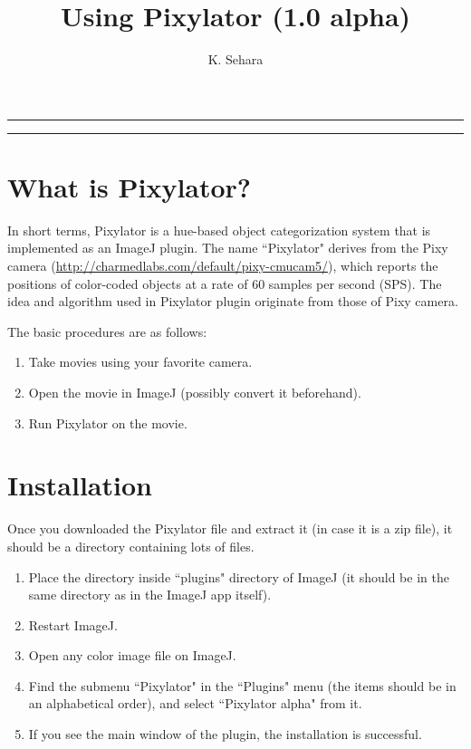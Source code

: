 \documentclass[a4paper,oneside,10pt]{article}
\title{Using Pixylator (1.0 alpha)}
\author{K. Sehara}
\date{\vspace{-5ex}}
\begin{document}
\maketitle

\hrule

\tableofcontents

\vspace{3ex}

\hrule

\newpage

\section{What is Pixylator?}
In short terms, Pixylator is a hue-based object categorization system that is implemented as an ImageJ plugin. The name ``Pixylator" derives from the Pixy camera (\url{http://charmedlabs.com/default/pixy-cmucam5/}), which reports the positions of color-coded objects at a rate of 60 samples per second (SPS). 
The idea and algorithm used in Pixylator plugin originate from those of Pixy camera.


The basic procedures are as follows:
\begin{enumerate}
\item Take movies using your favorite camera.
\item Open the movie in ImageJ (possibly convert it beforehand).
\item Run Pixylator on the movie.
\end{enumerate}



\section{Installation}
Once you downloaded the Pixylator file and extract it (in case it is a zip file), it should be a directory containing lots of files. 

\begin{enumerate}
\item Place the directory inside ``plugins" directory of ImageJ (it should be in the same directory as in the ImageJ app itself).
\item Restart ImageJ.
\item Open any color image file on ImageJ.
\item Find the submenu ``Pixylator" in the ``Plugins" menu (the items should be in an alphabetical order), and select ``Pixylator alpha" from it.
\item If you see the main window of the plugin, the installation is successful.
\end{enumerate}
\end{document}
